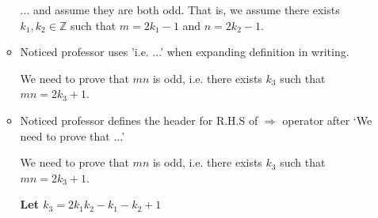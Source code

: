 \documentclass[12pt]{article}
\begin{document}
\begin{itemize}
\begin{itemize}
        \bigskip

        \begin{mdframed}
            ... and assume they are both odd. That is, we assume there exists $k_1,k_2 \in \mathbb{Z}$
            such that $m = 2k_1 -1$ and $n = 2k_2 - 1$.
        \end{mdframed}

        \item Noticed professor uses 'i.e. ...' when expanding definition in writing.

        \bigskip

        \begin{mdframed}
            We need to prove that $mn$ is odd, i.e. there exists $k_3$ such that
            $mn = 2k_3 + 1$.
        \end{mdframed}

        \item Noticed professor defines the header for R.H.S of $\Rightarrow$
        operator after `We need to prove that ...'

        \bigskip

        \begin{mdframed}
            We need to prove that $mn$ is odd, i.e. there exists $k_3$ such that
            $mn = 2k_3 + 1$.

            \bigskip

            \textbf{Let $k_3 = 2k_1k_2 - k_1 - k_2 + 1$}
        \end{mdframed}


    \end{itemize}










\end{itemize}
\end{document}
